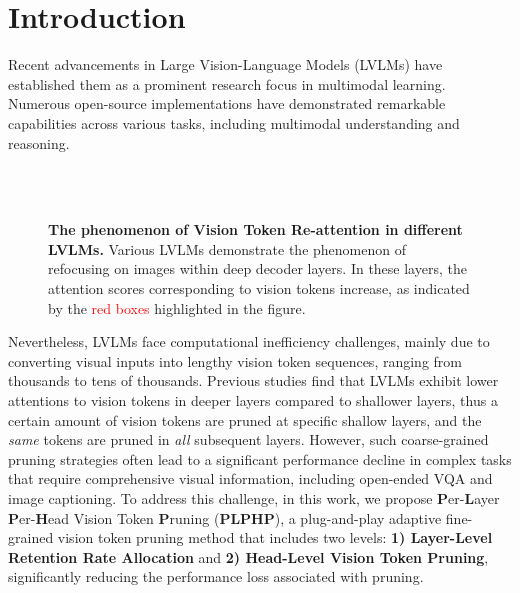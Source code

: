\section{Introduction}
\label{sec::intro}

Recent advancements in Large Vision-Language Models (LVLMs) have established them as a prominent research focus in multimodal learning. Numerous open-source implementations have demonstrated remarkable capabilities across various tasks, including multimodal understanding and reasoning.

\begin{figure}[h!]
	\centering
	\\ \quad \\ \quad
	\caption{\textbf{The phenomenon of Vision Token Re-attention in different LVLMs.} Various LVLMs demonstrate the phenomenon of refocusing on images within deep decoder layers. In these layers, the attention scores corresponding to vision tokens increase, as indicated by the \textcolor{red}{red boxes} highlighted in the figure.}
        \vspace{-0.4cm}
		\label{fig:refocus}
\end{figure}

Nevertheless, LVLMs face computational inefficiency challenges, mainly due to converting visual inputs into lengthy vision token sequences, ranging from thousands to tens of thousands. Previous studies \cite{chen2024image,lin2024boosting} find that LVLMs exhibit lower attentions to vision tokens in deeper layers compared to shallower layers, thus a certain amount of vision tokens are pruned at specific shallow layers, and the \textit{same} tokens are pruned in \textit{all} subsequent layers. However, such coarse-grained pruning strategies often lead to a significant performance decline in complex tasks that require comprehensive visual information, including open-ended VQA and image captioning. To address this challenge, in this work, we propose \textbf{P}er-\textbf{L}ayer \textbf{P}er-\textbf{H}ead Vision Token \textbf{P}runing (\textbf{PLPHP}), a plug-and-play adaptive fine-grained vision token pruning method that includes two levels: \textbf{1) Layer-Level Retention Rate Allocation} and \textbf{2) Head-Level Vision Token Pruning}, significantly reducing the performance loss associated with pruning.


